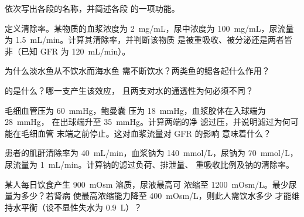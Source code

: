 \begin{exercise}[$\star$]\label{exo:b3:renal-osmoregulation:1}
依次写出各段的名称，并简述各段
的一项功能。
\end{exercise}

\begin{exercise}[$\star$]\label{exo:b3:renal-osmoregulation:2}
定义清除率。某物质的血浆浓度为
\qty{2}{mg/mL}，尿中浓度为 \qty{100}{mg/mL}，尿流量为
\qty{1.5}{mL/min}。计算其清除率，并判断该物质
是被重吸收、被分泌还是两者皆非（已知 GFR 为 \qty{120}{mL/min}）。
\end{exercise}

\begin{exercise}[$\star$]\label{exo:b3:renal-osmoregulation:3}
为什么淡水鱼从不饮水而海水鱼
需不断饮水？两类鱼的鳃各起什么作用？
\end{exercise}

\begin{exercise}[$\star$]\label{exo:b3:renal-osmoregulation:4}
的是什么？哪一支产生该效应，
且两支对水的通透性为何必须不同？
\end{exercise}

\begin{exercise}[$\star\star$]\label{exo:b3:renal-osmoregulation:5}
毛细血管压为 \qty{60}{mmHg}，鲍曼囊
压为 \qty{18}{mmHg}，血浆胶体在入球端为 \qty{28}{mmHg}，
在出球端升至 \qty{35}{mmHg}。计算两端的净
滤过压，并说明滤过为何可能在毛细血管
末端之前停止。这对血浆流量对 GFR 的影响
意味着什么？
\end{exercise}

\begin{exercise}[$\star\star$]\label{exo:b3:renal-osmoregulation:6}
患者的肌酐清除率为 \qty{40}{mL/min}，血浆钠为
\qty{140}{mmol/L}，尿钠为 \qty{70}{mmol/L}，尿流量为
\qty{1}{mL/min}。计算钠的滤过负荷、排泄量、
重吸收比例及钠的清除率。
\end{exercise}

\begin{exercise}[$\star\star$]\label{exo:b3:renal-osmoregulation:7}
某人每日饮食产生 \qty{900}{mOsm} 溶质，尿液最高可
浓缩至 \qty{1200}{mOsm/L}。最少尿量为多少？若肾病
使最高浓缩能力降至 \qty{400}{mOsm/L}，则此人需饮水多少
才能维持水平衡（设不显性失水为 \qty{0.9}{L}）？
\end{exercise}

